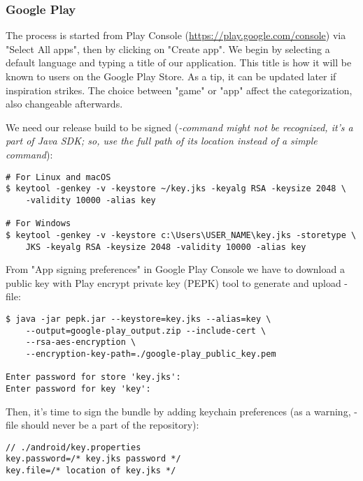 
\subsubsection{Google Play}

The process is started from Play Console (\href{https://play.google.com/console}{https://play.google.com/console}) 
via "Select All apps", then by clicking on "Create app". We begin by selecting a default language and typing a 
title of our application. This title is how it will be known to users on the Google Play Store. As a tip, it can be 
updated later if inspiration strikes. The choice between "game" or "app" affect the categorization, also changeable 
afterwards.

We need our release build to be signed (\emph{-command might not be recognized, it's a part of Java SDK; so,
use the full path of its location instead of a simple command}):

\begin{lstlisting}[language=terminal]
# For Linux and macOS
$ keytool -genkey -v -keystore ~/key.jks -keyalg RSA -keysize 2048 \
    -validity 10000 -alias key

# For Windows
$ keytool -genkey -v -keystore c:\Users\USER_NAME\key.jks -storetype \
    JKS -keyalg RSA -keysize 2048 -validity 10000 -alias key
\end{lstlisting}

\noindent From "App signing preferences" in Google Play Console we have to download a public key with Play encrypt 
private key (PEPK) tool to generate and upload -file:

\begin{lstlisting}[language=terminal]
$ java -jar pepk.jar --keystore=key.jks --alias=key \
    --output=google-play_output.zip --include-cert \
    --rsa-aes-encryption \
    --encryption-key-path=./google-play_public_key.pem 

Enter password for store 'key.jks':
Enter password for key 'key':
\end{lstlisting}

\noindent Then, it's time to sign the bundle by adding keychain preferences (as a warning, -file 
should never be a part of the repository):

\begin{lstlisting}
// ./android/key.properties
key.password=/* key.jks password */
key.file=/* location of key.jks */
\end{lstlisting}

